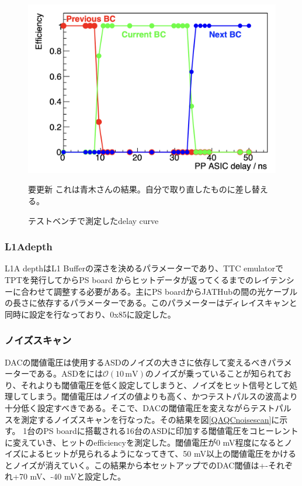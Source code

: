\begin{figure} 
\centering
\includegraphics[width=16cm]{fig/QAQC/QAQCdelayscan.png}
\caption[ディレイカーブ]{テストベンチで測定したdelay curve}
\begin{itembox}{要更新}
    これは青木さんの結果。自分で取り直したものに差し替える。
\end{itembox}
\label{QAQCdelayscan}
\end{figure}

\subsubsection{L1Adepth}
L1A depthはL1 Bufferの深さを決めるパラメーターであり、TTC emulatorでTPTを発行してからPS board からヒットデータが返ってくるまでのレイテンシーに合わせて調整する必要がある。主にPS boardからJATHubの間の光ケーブルの長さに依存するパラメーターである。このパラメーターはディレイスキャンと同時に設定を行なっており、0x85に設定した。
\baselineskip

\subsubsection{ノイズスキャン}
DACの閾値電圧は使用するASDのノイズの大きさに依存して変えるべきパラメーターである。ASDをには$\mathcal{O}(10 \,\mathrm{mV})$のノイズが乗っていることが知られており、それよりも閾値電圧を低く設定してしまうと、ノイズをヒット信号として処理してしまう。閾値電圧はノイズの値よりも高く、かつテストパルスの波高より十分低く設定すべきである。そこで、DACの閾値電圧を変えながらテストパルスを測定するノイズスキャンを行なった。その結果を図\ref{QAQCnoisescan}に示す。
1台のPS boardに搭載される16台のASDに印加する閾値電圧をコヒーレントに変えていき、ヒットのefficiencyを測定した。閾値電圧が0 mV程度になるとノイズによるヒットが見られるようになってきて、50 mV以上の閾値電圧をかけるとノイズが消えていく。この結果から本セットアップでのDAC閾値は+-それぞれ+70 mV、-40 mVと設定した。
\baselineskip

